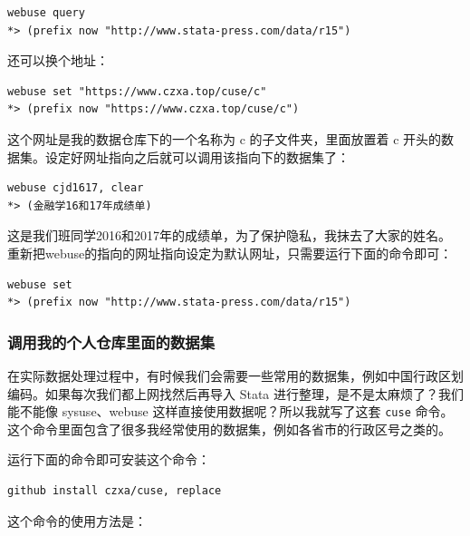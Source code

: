 \begin{lstlisting}
webuse query
*> (prefix now "http://www.stata-press.com/data/r15")
\end{lstlisting}

还可以换个地址：

\begin{lstlisting}
webuse set "https://www.czxa.top/cuse/c"
*> (prefix now "https://www.czxa.top/cuse/c")
\end{lstlisting}

这个网址是我的数据仓库下的一个名称为 c 的子文件夹，里面放置着 c 开头的数据集。设定好网址指向之后就可以调用该指向下的数据集了：

\begin{lstlisting}
webuse cjd1617, clear
*> (金融学16和17年成绩单)
\end{lstlisting}

这是我们班同学2016和2017年的成绩单，为了保护隐私，我抹去了大家的姓名。
重新把webuse的指向的网址指向设定为默认网址，只需要运行下面的命令即可：

\begin{lstlisting}
webuse set
*> (prefix now "http://www.stata-press.com/data/r15")
\end{lstlisting}

\subsubsection{调用我的个人仓库里面的数据集}
在实际数据处理过程中，有时候我们会需要一些常用的数据集，例如中国行政区划编码。如果每次我们都上网找然后再导入 Stata 进行整理，是不是太麻烦了？我们能不能像 sysuse、webuse 这样直接使用数据呢？所以我就写了这套 \lstinline{cuse} 命令。这个命令里面包含了很多我经常使用的数据集，例如各省市的行政区号之类的。

运行下面的命令即可安装这个命令：

\begin{lstlisting}
github install czxa/cuse, replace
\end{lstlisting}

这个命令的使用方法是：

